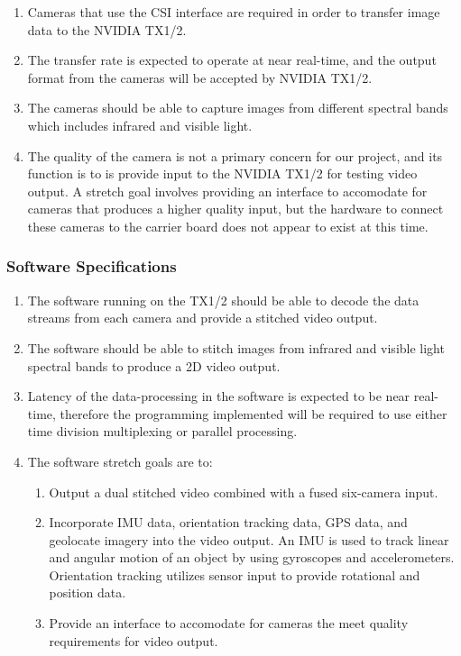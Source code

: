 \documentclass[letterpaper,10pt,serif,draftclsnofoot,onecolumn,compsoc,titlepage]{IEEEtran}
\begin{document}
\begin{enumerate}[label=\alph*]
	\item Cameras that use the CSI interface are required in order to transfer image data to 
	the NVIDIA TX1/2.\\
	\item The transfer rate is expected to operate at near real-time, and the output format 
	from the cameras will be accepted by NVIDIA TX1/2.\\
	\item The cameras should be able to capture images from different spectral bands 
	which includes infrared and visible light.\\
	\item The quality of the camera is not a primary concern for our project, and its 
	function is to is provide input to the NVIDIA TX1/2 for testing video output. 
	A stretch goal involves providing an interface to accomodate for cameras that 
	produces a higher quality input, but the hardware to connect these cameras to the 
	carrier board does not appear to exist at this time.\\
\end{enumerate}

\subsubsection{Software Specifications}

\begin{enumerate}[label=\alph*]
	\item The software running on the TX1/2 should be able to decode the data streams 
	from each camera and provide a stitched video output.\\
	\item The software should be able to stitch images from infrared 
	and visible light spectral bands to produce a 2D video output. \\
	\item Latency of the data-processing in the software is expected to be near 
	real-time, therefore the programming implemented will be required to use either time
	division multiplexing or parallel processing. \\
	\item The software stretch goals are to:
	\begin{enumerate}
	 	\item Output a dual stitched video combined with a fused six-camera input.\\
		\item Incorporate IMU data, orientation tracking data, GPS data, and geolocate 
		imagery into the video output. An IMU is used to track linear and angular 
		motion of an object by using gyroscopes and accelerometers. Orientation 
		tracking utilizes sensor input to provide rotational and position data.\\
		\item Provide an interface to accomodate for cameras the meet quality
		requirements for video output. \\
	\end{enumerate} 
\end{enumerate}
\end{document}
